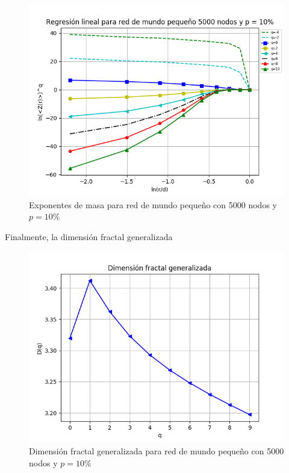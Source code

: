 \begin{figure}[H]
    \centering
    \includegraphics[scale=0.7]{Capitulo4Multifractalidad/imagenes/smallWorld5000p10_TqLnrBCsmallWorld5000p10.png}
    \caption{Exponentes de masa para red de mundo pequeño con 5000 nodos y $p=10\%$}
\end{figure}

Finalmente, la dimensión fractal generalizada


\begin{figure}[H]
    \centering
    \includegraphics[scale=0.7]{Capitulo4Multifractalidad/imagenes/smallWorld5000p10_DqsmallWorld5000p10.png}
    \caption{Dimensión fractal generalizada para red de mundo pequeño con 5000 nodos y $p=10\%$}
\end{figure}

